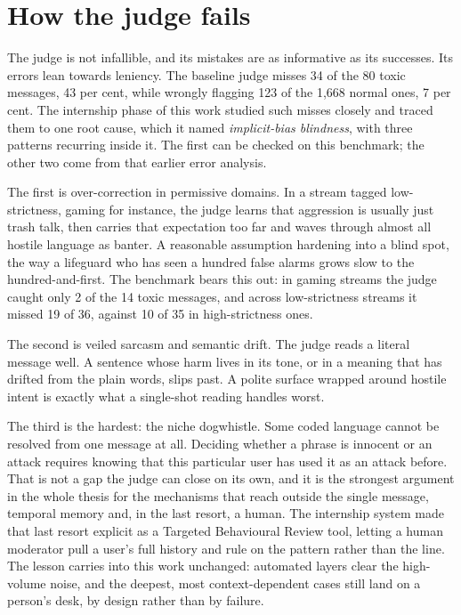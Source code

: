 \section{How the judge fails}\label{how-the-judge-fails}

The judge is not infallible, and its mistakes are as informative as its successes. Its errors lean towards leniency. The baseline judge misses 34 of the 80 toxic messages, 43 per cent, while wrongly flagging 123 of the 1,668 normal ones, 7 per cent. The internship phase of this work studied such misses closely and traced them to one root cause, which it named \emph{implicit-bias blindness}, with three patterns recurring inside it. The first can be checked on this benchmark; the other two come from that earlier error analysis.

The first is over-correction in permissive domains. In a stream tagged low-strictness, gaming for instance, the judge learns that aggression is usually just trash talk, then carries that expectation too far and waves through almost all hostile language as banter. A reasonable assumption hardening into a blind spot, the way a lifeguard who has seen a hundred false alarms grows slow to the hundred-and-first. The benchmark bears this out: in gaming streams the judge caught only 2 of the 14 toxic messages, and across low-strictness streams it missed 19 of 36, against 10 of 35 in high-strictness ones.

The second is veiled sarcasm and semantic drift. The judge reads a literal message well. A sentence whose harm lives in its tone, or in a meaning that has drifted from the plain words, slips past. A polite surface wrapped around hostile intent is exactly what a single-shot reading handles worst.

The third is the hardest: the niche dogwhistle. Some coded language cannot be resolved from one message at all. Deciding whether a phrase is innocent or an attack requires knowing that this particular user has used it as an attack before. That is not a gap the judge can close on its own, and it is the strongest argument in the whole thesis for the mechanisms that reach outside the single message, temporal memory and, in the last resort, a human. The internship system made that last resort explicit as a Targeted Behavioural Review tool, letting a human moderator pull a user's full history and rule on the pattern rather than the line. The lesson carries into this work unchanged: automated layers clear the high-volume noise, and the deepest, most context-dependent cases still land on a person's desk, by design rather than by failure.

